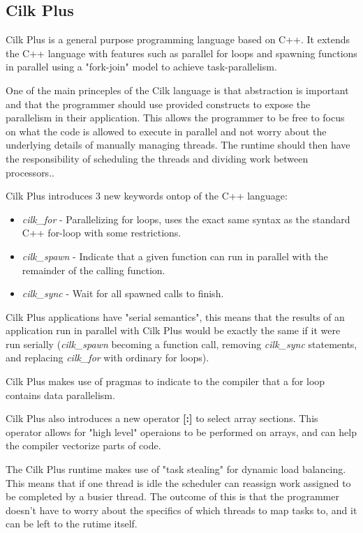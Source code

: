 \subsection{Cilk Plus}

Cilk Plus is a general purpose programming language based on C++. It extends the C++ language with features such as
parallel for loops and spawning functions in parallel using a "fork-join" model to achieve task-parallelism.

One of the main princeples of the Cilk language is that abstraction is important and that the programmer should use provided constructs to expose 
the parallelism in their application. This allows the programmer to be free to focus on what the code is allowed to execute in parallel and not worry about the underlying details of manually managing threads. The runtime should then have the responsibility of scheduling the threads and dividing work between
processors.\cite{cilkfaq}. 

Cilk Plus introduces 3 new keywords ontop of the C++ language\cite{cilk}: 
\begin{itemize}
    \item \textit{cilk\_for} - Parallelizing for loops, uses the exact same syntax as the standard C++ for-loop
                             with some restrictions.
    \item \textit{cilk\_spawn} - Indicate that a given function can run in parallel with the remainder
                              of the calling function. 
    \item \textit{cilk\_sync} - Wait for all spawned calls to finish.
\end{itemize}

Cilk Plus applications have "serial semantics"\cite{cilk}, this means that the results of an application run
in parallel with Cilk Plus would be exactly the same if it were run
serially (\textit{cilk\_spawn} becoming a function call, removing \textit{cilk\_sync} statements, 
and replacing \textit{cilk\_for} with ordinary for loops).

Cilk Plus makes use of pragmas to indicate to the compiler that a for loop contains data parallelism.\cite{cilkfaq}

Cilk Plus also introduces a new operator \textbf{[:]} to select array sections\cite{cilkarray}. This operator
allows for "high level" operaions to be performed on arrays, and can help the compiler vectorize parts of code.

The Cilk Plus runtime makes use of "task stealing" for dynamic load balancing\cite{cilkfaq}. This 
means that if one thread is idle the scheduler can reassign work assigned to be completed by a busier thread. 
The outcome of this is that the programmer doesn't have to worry about the specifics of which threads
to map tasks to, and it can be left to the rutime itself.


